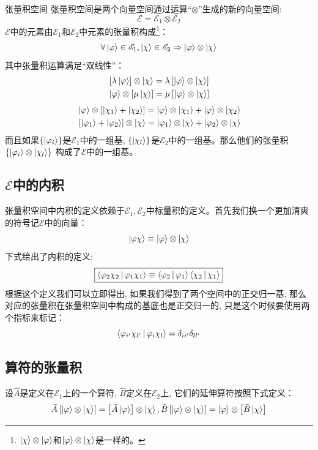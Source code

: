\documentclass[a4paper,zihao=-4,linespread=1]{ctexrep}
\begin{document}
    \begin{define}{张量积空间}
        张量积空间是两个向量空间通过运算“$\otimes$”生成的新的向量空间:
        \[\mathscr{E}=\mathscr{E}_1\otimes\mathscr{E}_2\]
        $\mathscr{E}$中的元素由$\mathscr{E}_1$和$\mathscr{E}_2$中元素的张量积构成\footnote{$\ket{\chi}\otimes\ket{\varphi}$和$\ket{\varphi}\otimes\ket{\chi}$是一样的。}：
        \[\forall\ket{\varphi}\in\mathscr{E}_1,\ket{\chi}\in\mathscr{E}_2\Rightarrow\ket{\varphi}\otimes\ket{\chi}\]
        其中张量积运算满足“双线性”：
        \begin{align}
            & \left[\lambda\ket{\varphi}\right]\otimes\ket{\chi}=\lambda\left[\ket{\varphi}\otimes\ket{\chi}\right]\\
            & \ket{\varphi}\otimes\left[\mu\ket{\chi}\right]=\mu\left[\ket{\varphi}\otimes\ket{\chi}\right]
        \end{align}
        \begin{align}
            & \ket{\varphi}\otimes\left[\ket{\chi_1}+\ket{\chi_2}\right]=\ket{\varphi}\otimes\ket{\chi_1}+\ket{\varphi}\otimes\ket{\chi_2}\\
            & \left[\ket{\varphi_1}+\ket{\varphi_2}\right]\otimes\ket{\chi}=\ket{\varphi_1}\otimes\ket{\chi}+\ket{\varphi_2}\otimes\ket{\chi}
        \end{align}
        而且如果$\{\ket{\varphi_i}\}$是$\mathscr{E}_1$中的一组基, $\{\ket{\chi_l}\}$是$\mathscr{E}_2$中的一组基。那么他们的张量积$\{\ket{\varphi_i}\otimes\ket{\chi_l}\}$
        构成了$\mathscr{E}$中的一组基。
    \end{define}
    \subsection*{$\mathscr{E}$中的内积}
    张量积空间中内积的定义依赖于$\mathscr{E}_1,\mathscr{E}_2$中标量积的定义。首先我们换一个更加清爽的符号记$\mathscr{E}$中的向量：
    \[\ket{\varphi\chi}\equiv\ket{\varphi}\otimes\ket{\chi}\]
    下式给出了内积的定义:
    \begin{equation}
        \boxed{
            \Braket{\varphi_2\chi_2|\varphi_1\chi_1}\equiv\Braket{\varphi_2|\varphi_1}\Braket{\chi_2|\chi_1}
        }
    \end{equation}
    根据这个定义我们可以立即得出, 如果我们得到了两个空间中的正交归一基, 那么对应的张量积在张量积空间中构成的基底也是正交归一的, 只是这个时候要使用两个指标来标记：
    \[\Braket{\varphi_{i^\prime}\chi_{l^\prime}|\varphi_i\chi_l}=\delta_{ii^\prime}\delta_{ll^\prime}\]
    \subsection*{算符的张量积}
    设$\hat{A}$是定义在$\mathscr{E}_1$上的一个算符, $\hat{B}$定义在$\mathscr{E}_2$上, 它们的延伸算符按照下式定义：
    \[\tilde{A}\left[\ket{\varphi}\otimes\ket{\chi}\right]=\left[\tilde{A}\ket{\varphi}\right]\otimes\ket{\chi}
    ,\tilde{B}\left[\ket{\varphi}\otimes\ket{\chi}\right]=\ket{\varphi}\otimes\left[\tilde{B}\ket{\chi}\right]\]
   
\end{document}
